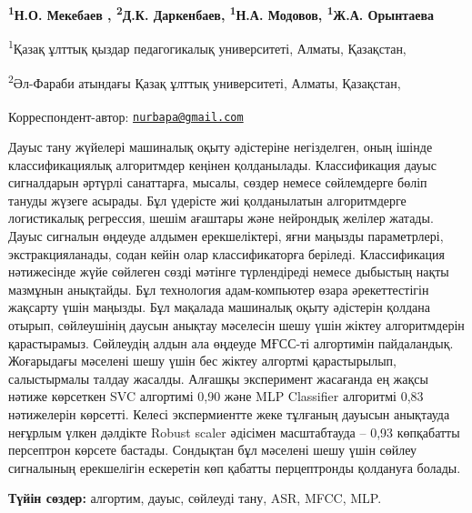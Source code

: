 
\begin{articleheader}

{\bfseries
\textsuperscript{1}Н.О. Мекебаев\textsuperscript{\envelope } \authorid,
\textsuperscript{2}Д.К. Даркенбаев\authorid,
\textsuperscript{1}Н.А. Модовов\authorid,
\textsuperscript{1}Ж.А. Орынтаева\authorid}
\end{articleheader}

\begin{affiliation}
\textsuperscript{1}Қазақ ұлттық қыздар педагогикалық университеті, Алматы, Қазақстан,

\textsuperscript{2}Әл-Фараби атындағы Қазақ ұлттық университеті, Алматы, Қазақстан,

\textsuperscript{\envelope }Корреспондент-автор: \href{mailto:nurbapa@gmail.com}{\nolinkurl{nurbapa@gmail.com}}
\end{affiliation}

Дауыс тану жүйелері машиналық оқыту әдістеріне негізделген, оның ішінде
классификациялық алгоритмдер кеңінен қолданылады. Классификация дауыс
сигналдарын әртүрлі санаттарға, мысалы, сөздер немесе сөйлемдерге бөліп
тануды жүзеге асырады. Бұл үдерісте жиі қолданылатын алгоритмдерге
логистикалық регрессия, шешім ағаштары және нейрондық желілер жатады.
Дауыс сигналын өңдеуде алдымен ерекшеліктері, яғни маңызды параметрлері,
экстракцияланады, содан кейін олар классификаторға беріледі.
Классификация нәтижесінде жүйе сөйлеген сөзді мәтінге түрлендіреді
немесе дыбыстың нақты мазмұнын анықтайды. Бұл технология адам-компьютер
өзара әрекеттестігін жақсарту үшін маңызды. Бұл мақалада машиналық оқыту
әдістерін қолдана отырып, сөйлеушінің даусын анықтау мәселесін шешу үшін
жіктеу алгоритмдерін қарастырамыз. Сөйлеудің алдын ала өңдеуде МҒСС-ті
алгортимін пайдаландық. Жоғарыдағы мәселені шешу үшін бес жіктеу
алгортмі қарастырылып, салыстырмалы талдау жасалды. Алғашқы эксперимент
жасағанда ең жақсы нәтиже көрсеткен SVC алгортимі 0,90 және MLP
Classifier алгоритмі 0,83 нәтижелерін көрсетті. Келесі экспермиентте
жеке тұлғаның дауысын анықтауда неғұрлым үлкен дәлдікте Robust scaler
әдісімен масштабтауда -- 0,93 көпқабатты персептрон көрсете бастады.
Сондықтан бұл мәселені шешу үшін сөйлеу сигналының ерекшелігін ескеретін
көп қабатты перцептронды қолдануға болады.

{\bfseries Түйін сөздер:} алгортим, дауыс, сөйлеуді тану, ASR, MFCC, MLP.

